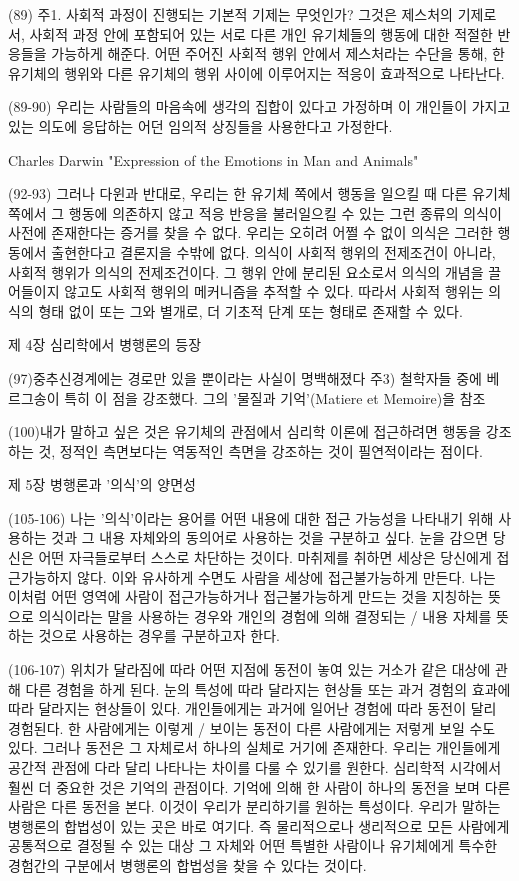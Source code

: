 \documentclass[12pt, a4paper]{article}
\begin{document}
(89) 주1. 사회적 과정이 진행되는 기본적 기제는 무엇인가? 그것은 제스처의 기제로서, 사회적 과정 안에 포함되어 있는 서로 다른 개인 유기체들의 행동에 대한 적절한 반응들을 가능하게 해준다. 어떤 주어진 사회적 행위 안에서 제스처라는 수단을 통해, 한 유기체의 행위와 다른 유기체의 행위 사이에 이루어지는 적응이 효과적으로 나타난다.  

(89-90) 우리는 사람들의 마음속에 생각의 집합이 있다고 가정하며 이 개인들이 가지고 있는 의도에 응답하는 어던 임의적 상징들을 사용한다고 가정한다. 

Charles Darwin "Expression of the Emotions in Man and Animals"

(92-93) 그러나 다윈과 반대로, 우리는 한 유기체 쪽에서 행동을 일으킬 때 다른 유기체 쪽에서 그 행동에 의존하지 않고 적응 반응을 불러일으킬 수 있는 그런 종류의 의식이 사전에 존재한다는 증거를 찾을 수 없다. 우리는 오히려 어쩔 수 없이 의식은 그러한 행동에서 출현한다고 결론지을 수밖에 없다. 의식이 사회적 행위의 전제조건이 아니라, 사회적 행위가 의식의 전제조건이다. 그 행위 안에 분리된 요소로서 의식의 개념을 끌어들이지 않고도 사회적 행위의 메커니즘을 추적할 수 있다. 따라서 사회적 행위는 의식의 형태 없이 또는 그와 별개로, 더 기초적 단계 또는 형태로 존재할 수 있다.



제 4장 심리학에서 병행론의 등장

(97)중추신경계에는 경로만 있을 뿐이라는 사실이 명백해졌다
주3) 철학자들 중에 베르그송이 특히 이 점을 강조했다. 그의 '물질과 기억'(Matiere et Memoire)을 참조

(100)내가 말하고 싶은 것은 유기체의 관점에서 심리학 이론에 접근하려면 행동을 강조하는 것, 정적인 측면보다는 역동적인 측면을 강조하는 것이 필연적이라는 점이다.



제 5장 병행론과 '의식'의 양면성

(105-106) 나는 '의식'이라는 용어를 어떤 내용에 대한 접근 가능성을 나타내기 위해 사용하는 것과 그 내용 자체와의 동의어로 사용하는 것을 구분하고 싶다. 눈을 감으면 당신은 어떤 자극들로부터 스스로 차단하는 것이다. 마취제를 취하면 세상은 당신에게 접근가능하지 않다. 이와 유사하게 수면도 사람을 세상에 접근불가능하게 만든다. 나는 이처럼 어떤 영역에 사람이 접근가능하거나 접근불가능하게 만드는 것을 지칭하는 뜻으로 의식이라는 말을 사용하는 경우와 개인의 경험에 의해 결정되는 / 내용 자체를 뜻하는 것으로 사용하는 경우를 구분하고자 한다.

(106-107) 위치가 달라짐에 따라 어떤 지점에 동전이 놓여 있는 거소가 같은 대상에 관해 다른 경험을 하게 된다. 눈의 특성에 따라 달라지는 현상들 또는 과거 경험의 효과에 따라 달라지는 현상들이 있다. 개인들에게는 과거에 일어난 경험에 따라 동전이 달리 경험된다. 한 사람에게는 이렇게 / 보이는 동전이 다른 사람에게는 저렇게 보일 수도 있다. 그러나 동전은 그 자체로서 하나의 실체로 거기에 존재한다. 우리는 개인들에게 공간적 관점에 다라 달리 나타나는 차이를 다룰 수 있기를 원한다. 심리학적 시각에서 훨씬 더 중요한 것은 기억의 관점이다. 기억에 의해 한 사람이 하나의 동전을 보며 다른 사람은 다른 동전을 본다. 이것이 우리가 분리하기를 원하는 특성이다. 우리가 말하는 병행론의 합법성이 있는 곳은 바로 여기다. 즉 물리적으로나 생리적으로 모든 사람에게 공통적으로 결정될 수 있는 대상 그 자체와 어떤 특별한 사람이나 유기체에게 특수한 경험간의 구분에서 병행론의 합법성을 찾을 수 있다는 것이다.
\end{document}
